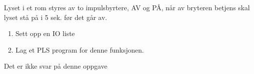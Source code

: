 


Lyset i et rom styres av to impulsbyrtere, AV og PÅ, når av bryteren
betjens skal lyset stå på i 5 sek. før det går av.
\begin{enumerate}
\item Sett opp en IO liste
\item Lag et PLS program for denne funksjonen.
\end{enumerate}







Det er ikke svar på denne oppgave












